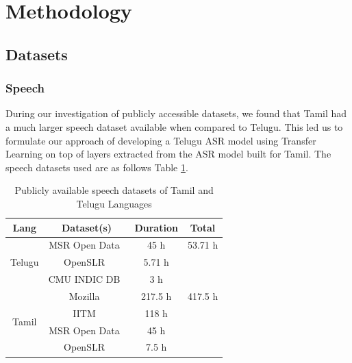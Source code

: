 \documentclass[11pt]{article} \usepackage{spconf,amsmath,graphicx}
\begin{document}
 

\section{Methodology}
\subsection{Datasets}
\subsubsection{Speech}
During our investigation of publicly accessible datasets, we found that Tamil had a much larger speech
dataset available when compared to Telugu. This led us to formulate our approach
of developing a Telugu ASR model using Transfer Learning on top of layers extracted from the ASR model built for Tamil.
The speech datasets used are as follows Table \ref{tab:langdata}.


\begin{table}[h]

\begin{center}

\begin{tabular}[width=5cm]{ |c|c|c|c| } 

\hline Lang & Dataset(s) & Duration & Total\\ \hline

\multirow{3}{4em}{Telugu} & MSR Open Data~\cite{srivastava2018interspeech} & 45 h & 53.71 h  \\ & OpenSLR~\cite{openslrtel}
& 5.71 h & \\ & CMU INDIC DB~\cite{cmuindic} & 3 h & \\ \hline

\multirow{4}{4em}{Tamil} & Mozilla~\cite{cvoice} & 217.5 h & 417.5 h \\ & IITM~\cite{iitmasr} & 118 h &  \\ & MSR Open Data~\cite{srivastava2018interspeech}
& 45 h & \\ & OpenSLR~\cite{openslrtel} & 7.5 h & \\ \hline


\end{tabular}
\caption{Publicly available speech datasets of Tamil and Telugu Languages}
\label{tab:langdata} \end{center} \end{table}
\end{document}
